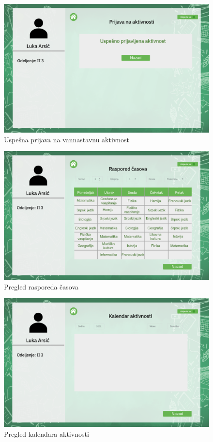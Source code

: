 \documentclass{article}
\begin{document}
\begin{figure} [!ht]
    \begin{center}
        \includegraphics[scale=0.22]{../UI/Ucenik/Student_form_activity check success.png}
    \end{center}
\caption{Uspešna prijava na vannastavnu aktivnost}
\end{figure}

\begin{figure} [!ht]
    \begin{center}
        \includegraphics[scale=0.22]{../UI/Ucenik/Student_classes.png}
    \end{center}
\caption{Pregled rasporeda časova}
\end{figure}

\begin{figure} [!ht]
    \begin{center}
        \includegraphics[scale=0.22]{../UI/Ucenik/Student_calendar.png}
    \end{center}
\caption{Pregled kalendara aktivnosti}
\end{figure}
\end{document}
